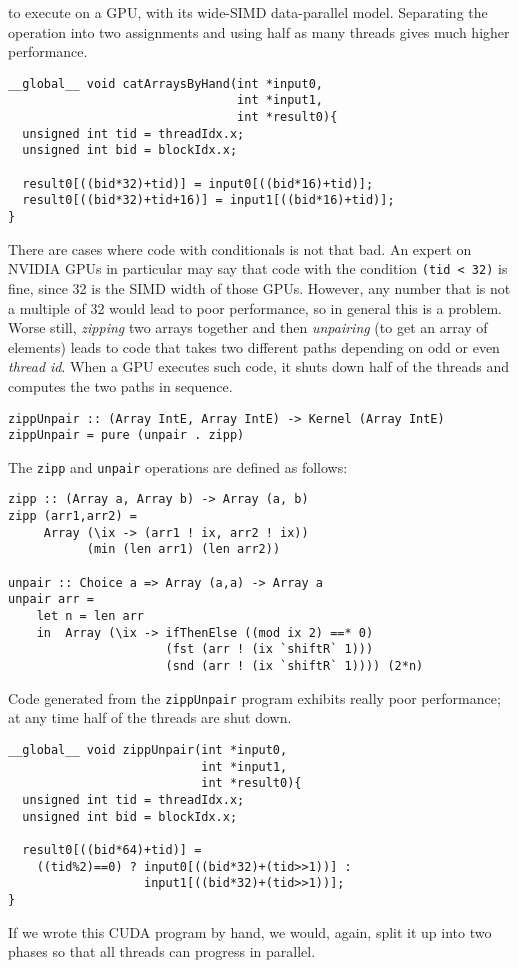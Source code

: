 to execute on a GPU, with its wide-SIMD data-parallel model. Separating
the operation into two assignments and using half as many threads gives
much higher performance.
\begin{codesize}
\begin{verbatim}
__global__ void catArraysByHand(int *input0,
                                int *input1,
                                int *result0){
  unsigned int tid = threadIdx.x;
  unsigned int bid = blockIdx.x;
  
  result0[((bid*32)+tid)] = input0[((bid*16)+tid)];
  result0[((bid*32)+tid+16)] = input1[((bid*16)+tid)];  
}
\end{verbatim}
\end{codesize}
There are cases where code with conditionals is not that bad. 
An expert on NVIDIA GPUs in particular may say that code with 
the condition {\tt (tid < 32)} is fine, since 32 is the SIMD width 
of those GPUs. However, any number that is not a multiple of 32 would 
lead to poor performance, so in general this is a problem. 
 Worse still, {\em zipping} two arrays together and then 
{\em unpairing} (to get an array of elements)
leads to code that takes two different paths depending 
on odd or even {\em thread id}. When a GPU executes such code, it 
shuts down half of the threads and computes the two paths in sequence. 
\begin{codesize}
\begin{verbatim}
zippUnpair :: (Array IntE, Array IntE) -> Kernel (Array IntE) 
zippUnpair = pure (unpair . zipp)
\end{verbatim}
\end{codesize}
The {\tt zipp} and {\tt unpair} operations are defined as follows: 
\begin{codesize}
\begin{verbatim}
zipp :: (Array a, Array b) -> Array (a, b)             
zipp (arr1,arr2) = 
     Array (\ix -> (arr1 ! ix, arr2 ! ix)) 
           (min (len arr1) (len arr2))

unpair :: Choice a => Array (a,a) -> Array a
unpair arr = 
    let n = len arr
    in  Array (\ix -> ifThenElse ((mod ix 2) ==* 0) 
                      (fst (arr ! (ix `shiftR` 1)))
                      (snd (arr ! (ix `shiftR` 1)))) (2*n)
\end{verbatim}
\end{codesize}
Code generated from the {\tt zippUnpair} program exhibits really 
poor performance; at any time half of the threads are shut down. 
\begin{codesize}
\begin{verbatim}
__global__ void zippUnpair(int *input0,
                           int *input1,
                           int *result0){
  unsigned int tid = threadIdx.x;
  unsigned int bid = blockIdx.x;
  
  result0[((bid*64)+tid)] = 
    ((tid%2)==0) ? input0[((bid*32)+(tid>>1))] : 
                   input1[((bid*32)+(tid>>1))];
}
\end{verbatim}
\end{codesize}
If we wrote this CUDA program by hand, we would, again, split it up into 
two phases so that all threads can progress in parallel.  

